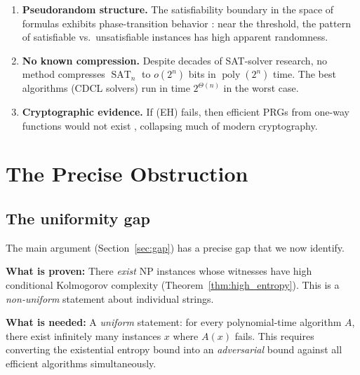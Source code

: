 \documentclass[aps,prd,twocolumn,superscriptaddress,nofootinbib]{revtex4-2}
\theoremstyle{definition}
\theoremstyle{remark}
\DeclareMathOperator{\poly}{poly}
\DeclareMathOperator{\SAT}{SAT}
\begin{document}
\begin{enumerate}
\item \textbf{Pseudorandom structure.} The satisfiability boundary in the space of formulas exhibits phase-transition behavior \cite{Monasson1999}: near the threshold, the pattern of satisfiable vs.\ unsatisfiable instances has high apparent randomness.

\item \textbf{No known compression.} Despite decades of SAT-solver research, no method compresses $\SAT_n$ to $o(2^n)$ bits in $\poly(2^n)$ time. The best algorithms (CDCL solvers) run in time $2^{\Theta(n)}$ in the worst case.

\item \textbf{Cryptographic evidence.} If (EH) fails, then efficient PRGs from one-way functions would not exist \cite{ImpagliazzoWigderson1997}, collapsing much of modern cryptography.
\end{enumerate}


\section{The Precise Obstruction}
\label{sec:obstruction}

\subsection{The uniformity gap}

The main argument (Section~\ref{sec:gap}) has a precise gap that we now identify.

\textbf{What is proven:} There \textit{exist} NP instances whose witnesses have high conditional Kolmogorov complexity (Theorem~\ref{thm:high_entropy}). This is a \textit{non-uniform} statement about individual strings.

\textbf{What is needed:} A \textit{uniform} statement: for every polynomial-time algorithm $A$, there exist infinitely many instances $x$ where $A(x)$ fails. This requires converting the existential entropy bound into an \textit{adversarial} bound against all efficient algorithms simultaneously.
\end{document}
